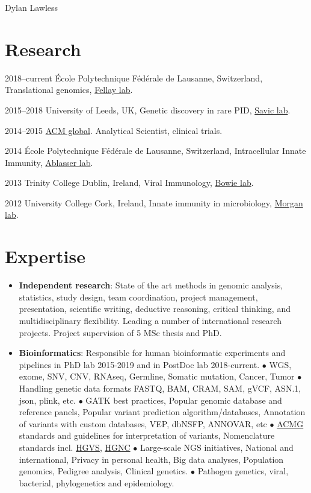 \documentclass[11pt,a4paper]{article}
\begin{document}
\begin{cv}{Dylan Lawless}
\section*{Research}
\begin{cvlist}{}
 \item [2018--current]  \'Ecole Polytechnique F\'ed\'erale de Lausanne, Switzerland, Translational genomics, \href{https://www.epfl.ch/labs/fellay-lab/}{Fellay lab}.
  \item [2015--2018] University of Leeds, UK, Genetic discovery in rare PID, \href{https://medicinehealth.leeds.ac.uk/medicine/staff/3046/dr-sinisa-savic}{Savic lab}.
  \item[2014--2015] \href{https://www.acmgloballab.com}{ACM global}. Analytical Scientist, clinical trials.
  \item [2014]  \'Ecole Polytechnique F\'ed\'erale de Lausanne, Switzerland, Intracellular Innate Immunity, \href{https://www.epfl.ch/labs/ablasserlab/}{Ablasser lab}.
  \item [2013] Trinity College Dublin, Ireland, Viral Immunology, \href{https://www.tcd.ie/Biochemistry/research/bowie/}{Bowie lab}.
  \item [2012] University College Cork, Ireland, Innate immunity in microbiology, \href{https://www.ucc.ie/en/microbiology/}{Morgan lab}.
  \end{cvlist}

\section*{Expertise}
 \begin{itemize}[leftmargin=*]

\item \textbf{Independent research}: State of the art methods in genomic analysis, statistics, study design, team coordination, project management, presentation, scientific writing, deductive reasoning, critical thinking, and multidisciplinary flexibility. Leading a number of international research projects.
Project supervision of 5 MSc thesis and PhD.

\item \textbf{Bioinformatics}:
Responsible for human bioinformatic experiments and pipelines in PhD lab 2015-2019 and in PostDoc lab 2018-current.
$\bullet$ WGS, exome, SNV, CNV, RNAseq, Germline, Somatic mutation, Cancer, Tumor
$\bullet$ Handling genetic data formats FASTQ, BAM, CRAM, SAM, gVCF, ASN.1, json, plink, etc.
$\bullet$ GATK best practices,
Popular genomic database and reference panels,
Popular variant prediction algorithm/databases,
Annotation of variants with custom databases, VEP, dbNSFP, ANNOVAR, etc
$\bullet$ \href{https://lawlessgenomics.com/topic/acgm-criteria-table-main}{ACMG} standards and guidelines for interpretation of variants,
Nomenclature standards incl. \href{http://varnomen.hgvs.org}{HGVS}, \href{https://www.genenames.org}{HGNC}
$\bullet$ Large-scale NGS initiatives, 
National and international,
Privacy in personal health,
Big data analyses,
Population genomics,	 
Pedigree analysis,
Clinical genetics.
$\bullet$ Pathogen genetics, viral, bacterial, phylogenetics and epidemiology.


\end{itemize}
\end{cv}
\end{document}
